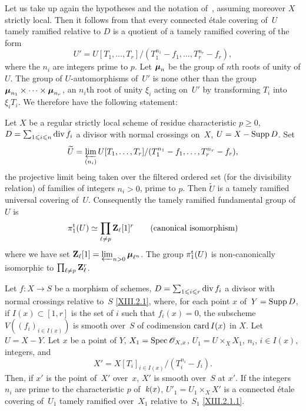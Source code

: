 \setcounter{subsection}{3} \setcounter{subsubsection}{-1}

\subsubsection{}
\label{XIII.5.3.0} Let us take up again the hypotheses and the notation
of~, assuming moreover
$X$
strictly local. Then
it follows from \loccit that every connected \'etale covering
of~$U$ tamely ramified relative to $D$ is a
quotient of a tamely ramified covering of the
form
$$
U'=U[T_1,\dots,T_r]/(T_1^{n_1}-f_1,\dots,T_r^{n_r}-f_r),
$$
where the $n_i$ are integers prime to $p$. Let
$\bbmu_n$ be the group of $n$th roots of unity of
$U$. The group of $U$-automorphisms of~$U'$ is none other than the
group $\bbmu_{n_1}\times\dots\times\bbmu_{n_r}$, an
$n_i$th root of unity $\xi_i$ acting on~$U'$ by
transforming $T_i$ into $\xi_i T_i$. We therefore have the following statement:

\setcounter{subsection}{2}

\begin{corollary}
\label{XIII.5.3} Let $X$ be a regular strictly local scheme
of residue characteristic $p\geq 0$, $D=\sum_{1\leq i\leq
n} \divisor f_i$ a divisor with normal crossings on~$X$,
$U=X-\Supp D$. Set
$$
\tilde U=\varprojlim_{(n_i)}
U[T_1,\dots,T_r]/(T_1^{n_1}-f_1,\dots,T_r^{n_r}-f_r),
$$
the projective limit being taken over the filtered ordered
set (for the divisibility relation) of families of integers
$n_i>0$, prime to $p$. Then $\tilde U$ is a tamely ramified
universal covering of~$U$. Consequently the tamely ramified
fundamental group of~$U$ is
$$
\pi_1^{\tame}(U)\simeq \prod_{\ell\neq p} \ZZ_\ell [1]^r
\qquad \text{(canonical isomorphism)}
$$
where we have set
$\ZZ_\ell[1]=\varprojlim_{n>0}\bbmu_{\ell^n}$. The group
$\pi_1^{\tame}(U)$ is non-canonically isomorphic to $\prod_{\ell\neq p}
\ZZ_\ell^r$.
%
\end{corollary}

\begin{proposition}
\label{XIII.5.4} Let $f\colon X\to S$ be a morphism of
schemes, $D=\sum_{1\leq i\leq r} \divisor f_i$ a divisor with
normal crossings relative to~$S$ \eqref{XIII.2.1}, where,
for each point $x$ of~$Y=\Supp D$, if $I(x)\subset[1,r]$ is
the set of $i$ such that $f_i(x)=0$, the subscheme
$V((f_i)_{i\in I(x)})$ is smooth over~$S$ of codimension
$\card I(x)$
in $X$. Let $U=X-Y$. Let $x$ be a point of
$Y$, $X_1=\Spec\cal{O}_{X,x}$, $U_1=U\times_X X_1$, $n_i$, $i\in I(x)$,
integers, and
$$
X'=X[T_i]_{i\in I(x)}/(T_i^{n_i}-f_i).
$$
Then, if $x'$ is the point of~$X'$ over~$x$, $X'$ is smooth
over~$S$ at $x'$. If the integers~$n_i$ are prime to the
characteristic $p$ of~$\kres(x)$, $U'_1=U_1\times_X X'$ is a
connected \'etale covering of~$U_1$ tamely
ramified over~$X_1$ relative to~$S_1$ \eqref{XIII.2.1.1}.
\end{proposition}

